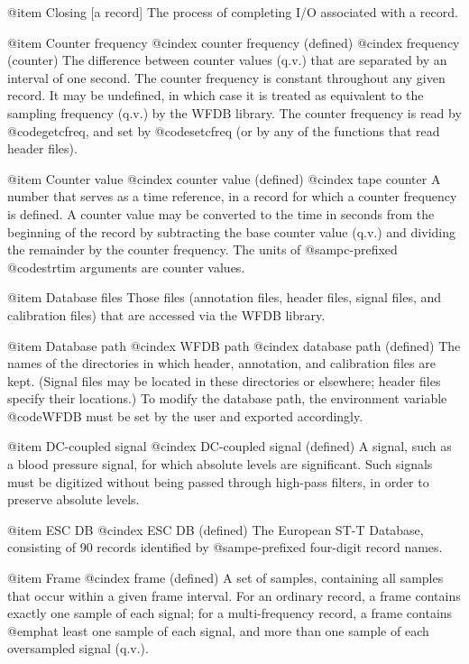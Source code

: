 {{{{{{{{@item Closing [a record]
The process of completing I/O associated with a record.

@item Counter frequency
@cindex counter frequency (defined)
@cindex frequency (counter)
The difference between counter values (q.v.) that are separated
by an interval of one second.  The counter frequency is constant
throughout any given record.  It may be undefined, in which case it is
treated as equivalent to the sampling frequency (q.v.) by the WFDB
library.  The counter frequency is read by @code{getcfreq},
and set by @code{setcfreq} (or by any of the functions that read
header files).

@item Counter value
@cindex counter value (defined)
@cindex tape counter
A number that serves as a time reference, in a record for which a
counter frequency is defined.  A counter value may be converted to the
time in seconds from the beginning of the record by subtracting the base
counter value (q.v.) and dividing the remainder by the counter
frequency.  The units of @samp{c}-prefixed @code{strtim} arguments are
counter values.

@item Database files
Those files (annotation files, header files, signal files, and
calibration files) that are accessed via the WFDB library.

@item Database path
@cindex WFDB path
@cindex database path (defined)
The names of the directories in which header, annotation, and calibration files
are kept.  (Signal files may be located in these directories or elsewhere;
header files specify their locations.)  To modify the database path, the
environment variable @code{WFDB} must be set by the user and exported
accordingly.

@item DC-coupled signal
@cindex DC-coupled signal (defined)
A signal, such as a blood pressure signal, for which absolute levels are
significant.  Such signals must be digitized without being passed
through high-pass filters, in order to preserve absolute levels.

@item ESC DB
@cindex ESC DB (defined)
The European ST-T Database, consisting of 90 records identified by
@samp{e}-prefixed four-digit record names.

@item Frame
@cindex frame (defined)
A set of samples, containing all samples that occur within a given
frame interval.  For an ordinary record, a frame contains exactly one
sample of each signal;  for a multi-frequency record, a frame contains
@emph{at least} one sample of each signal, and more than one sample of
each oversampled signal (q.v.).

}}}}}}}}
